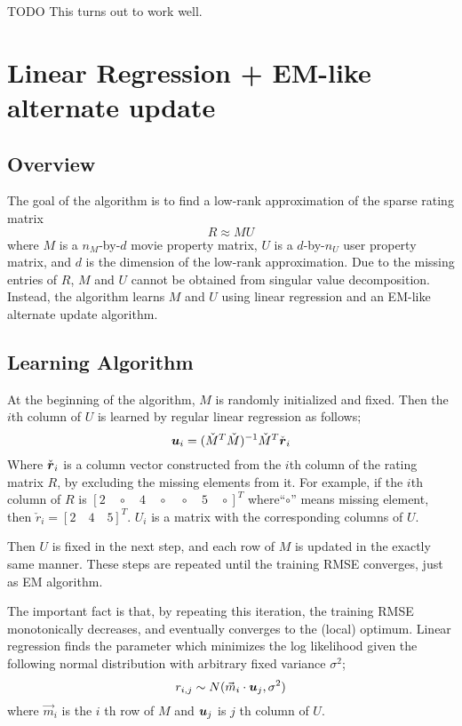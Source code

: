 \documentclass{article}
\newcommand{\vect} [1]{{ \mbox{\boldmath $#1$} }}
\begin{document}
TODO This turns out to work well.

\section{Linear Regression + EM-like alternate update}

\subsection{Overview}
The goal of the algorithm is to find a low-rank approximation of the sparse rating matrix
\begin{equation}
R \approx MU
\end{equation}
where $M$ is a $n_M$-by-$d$ movie property matrix, $U$ is a
$d$-by-$n_U$ user property matrix, and $d$ is the dimension of the
low-rank approximation. Due to the missing entries of $R$, $M$ and $U$
cannot be obtained from singular value decomposition. Instead, the
algorithm learns $M$ and $U$ using linear regression and an EM-like
alternate update algorithm.

\subsection{Learning Algorithm}

At the beginning of the algorithm, $M$ is randomly initialized and fixed. Then the $i$th column of $U$ is learned by regular linear regression as follows;
\begin{equation}
\vect{u}_i=(\check{M}^T\check{M})^{-1}\check{M}^T \check{\vect r}_i
\end{equation}
Where $\check{\vect r}_i$ is a column vector constructed from the $i$th column of the rating matrix $R$, by excluding the missing elements from it. For example, if the $i$th column of $R$ is $[2 \quad \circ \quad 4 \quad \circ \quad \circ \quad 5 \quad \circ]^T$ where``$\circ$'' means missing element, then $\check{r}_i = [2 \quad 4 \quad 5]^T$. $U_i$ is a matrix with the corresponding columns of $U$.

Then $U$ is fixed in the next step, and each row of $M$ is updated in the exactly same manner. These steps are repeated until the training RMSE converges, just as EM algorithm. 

The important fact is that, by repeating this iteration, the training RMSE monotonically decreases, and eventually converges to the (local) optimum. Linear regression finds the parameter which minimizes the log likelihood given the following normal distribution with arbitrary fixed variance $\sigma^2$;
\begin{equation}
r_{i,j}\sim N(\vec{m}_i \cdot {\vect u}_j, \sigma^2)
\end{equation}
where $\vec{m}_i$ is the $i$ th row of $M$ and ${\vect u}_j$ is $j$ th column of $U$.
\end{document}
